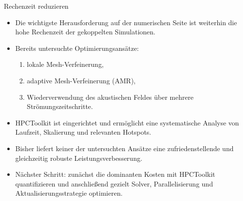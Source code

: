 \documentclass[
	german,%
	accentcolor=9c,%
	accept-missing-logos=true,%
]{tudabeamer}
\begin{document}
\begin{frame}{Rechenzeit reduzieren}
    \begin{itemize}
        \item Die wichtigste Herausforderung auf der numerischen Seite ist
        weiterhin die hohe Rechenzeit der gekoppelten Simulationen.
        \item Bereits untersuchte Optimierungsansätze:
        \begin{enumerate}
            \item lokale Mesh-Verfeinerung,
            \item adaptive Mesh-Verfeinerung (AMR),
            \item Wiederverwendung des akustischen Feldes über mehrere
            Strömungszeitschritte.
        \end{enumerate}
        \item HPCToolkit ist eingerichtet und ermöglicht eine systematische
        Analyse von Laufzeit, Skalierung und relevanten Hotspots.
        \item Bisher liefert keiner der untersuchten Ansätze eine
        zufriedenstellende und gleichzeitig robuste Leistungsverbesserung.
        \item Nächster Schritt: zunächst die dominanten Kosten mit HPCToolkit
        quantifizieren und anschließend gezielt Solver, Parallelisierung und
        Aktualisierungsstrategie optimieren.
    \end{itemize}
\end{frame}
\end{document}
